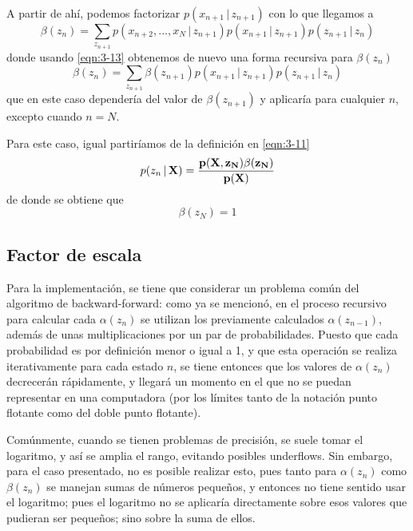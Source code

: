 A partir de ahí, podemos factorizar $p(x_{n+1} \,|\, z_{n+1})$ con lo que llegamos a 
\begin{equation}  
  \beta(z_n) = \sum_{z_{n+1}} p(x_{n+2}, ..., x_N \,|\, z_{n+1}) 
    p(x_{n+1} \,|\, z_{n+1}) p(z_{n+1} \,|\, z_n)    
    \label{eqn:3-17}
\end{equation}
donde usando \eqref{eqn:3-13} obtenemos de nuevo una forma recursiva para $\beta(z_n)$
\begin{equation}  
  \beta(z_n) = \sum_{z_{n+1}} \beta(z_{n+1})
    p(x_{n+1} \,|\, z_{n+1}) p(z_{n+1} \,|\, z_n)    
    \label{eqn:3-18}
\end{equation}
que en este caso dependería del valor de $\beta(z_{n+1})$ y aplicaría para cualquier $n$, excepto cuando $n = N$. 

Para este caso, igual partiríamos de la definición en \eqref{eqn:3-11}
\begin{equation}
  p(z_n \,|\, \bf{X}) = \frac{p(\bf{X}, z_N) \beta(z_N)} {p(\bf{X})}
  \label{eqn:3-19}
\end{equation}
de donde se obtiene que 
\begin{equation}
  \beta(z_N) = 1
  \label{eqn:3-20}
\end{equation}

\subsection{Factor de escala}
\label{sec:escala}

Para la implementación, se tiene que considerar un problema común del algoritmo de backward-forward: como ya se mencionó, en el proceso recursivo para calcular cada $\alpha(z_n)$ se utilizan los previamente calculados $\alpha(z_{n-1})$, además de unas multiplicaciones por un par de probabilidades. Puesto que cada probabilidad es por definición menor o igual a 1, y que esta operación se realiza iterativamente para cada estado $n$, se tiene entonces que los valores de $\alpha(z_n)$ decrecerán rápidamente, y llegará un momento en el que no se puedan representar en una computadora (por los límites tanto de la notación punto flotante como del doble punto flotante).

Comúnmente, cuando se tienen problemas de precisión, se suele tomar el logaritmo, y así se amplia el rango, evitando posibles underflows. Sin embargo, para el caso presentado, no es posible realizar esto, pues tanto para $\alpha(z_n)$ como $\beta(z_n)$ se manejan sumas de números pequeños, y entonces no tiene sentido usar el logaritmo; pues el logaritmo no se aplicaría directamente sobre esos valores que pudieran ser pequeños; sino sobre la suma de ellos.

